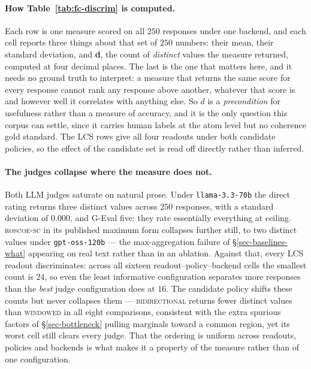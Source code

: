\paragraph{How Table~\ref{tab:fc-discrim} is computed.} Each row is one measure scored on all $250$
responses under one backend, and each cell reports three things about that set of $250$ numbers: their
mean, their standard deviation, and \textbf{d}, the count of \emph{distinct} values the measure
returned, computed at four decimal places. The last is the one that matters here, and it needs no
ground truth to interpret: a measure that returns the same score for every response cannot rank any
response above another, whatever that score is and however well it correlates with anything else. So
$d$ is a \emph{precondition} for usefulness rather than a measure of accuracy, and it is the only
question this corpus can settle, since it carries human labels at the atom level but no coherence
gold standard. The LCS rows give all four readouts under both candidate policies, so the effect of
the candidate set is read off directly rather than inferred.

\paragraph{The judges collapse where the measure does not.} Both LLM judges saturate on natural prose.
Under \texttt{llama-3.3-70b} the direct rating returns three distinct values across $250$ responses,
with a standard deviation of $0.000$, and G-Eval five: they rate essentially everything at ceiling.
\textsc{roscoe-sc} in its published maximum form collapses further still, to two distinct values under
\texttt{gpt-oss-120b} --- the max-aggregation failure of \S\ref{sec-baselines-what} appearing on real
text rather than in an ablation. Against that, every LCS readout discriminates: across all sixteen
readout--policy--backend cells the smallest count is $24$, so even the least informative configuration
separates more responses than the \emph{best} judge configuration does at $16$. The candidate policy
shifts these counts but never collapses them --- \textsc{bidirectional} returns fewer distinct values
than \textsc{windowed} in all eight comparisons, consistent with the extra spurious factors of
\S\ref{sec-bottleneck} pulling marginals toward a common region, yet its worst cell still clears every
judge. That the ordering is uniform across readouts, policies and backends is what makes it a property
of the measure rather than of one configuration.

